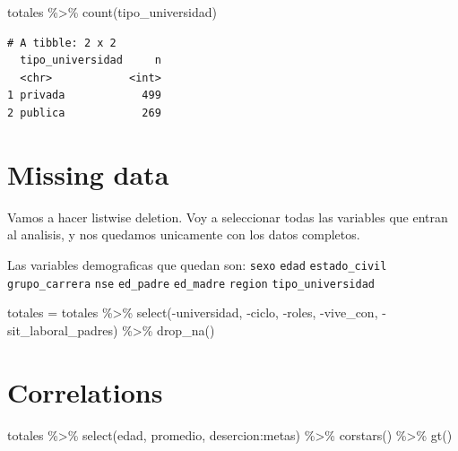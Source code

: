 \documentclass[
  letterpaper,
  DIV=11,
  numbers=noendperiod]{scrartcl}
\newenvironment{Shaded}{\begin{snugshade}}{\end{snugshade}}
\newcommand{\FunctionTok}[1]{\textcolor[rgb]{0.28,0.35,0.67}{#1}}
\newcommand{\NormalTok}[1]{\textcolor[rgb]{0.00,0.23,0.31}{#1}}
\newcommand{\OtherTok}[1]{\textcolor[rgb]{0.00,0.23,0.31}{#1}}
\newcommand{\SpecialCharTok}[1]{\textcolor[rgb]{0.37,0.37,0.37}{#1}}
\begin{document}
\begin{Shaded}
\begin{Highlighting}[]
\NormalTok{totales }\SpecialCharTok{\%\textgreater{}\%} \FunctionTok{count}\NormalTok{(tipo\_universidad)}
\end{Highlighting}
\end{Shaded}

\begin{verbatim}
# A tibble: 2 x 2
  tipo_universidad     n
  <chr>            <int>
1 privada            499
2 publica            269
\end{verbatim}

\section{Missing data}\label{missing-data}

Vamos a hacer listwise deletion. Voy a seleccionar todas las variables
que entran al analisis, y nos quedamos unicamente con los datos
completos.

Las variables demograficas que quedan son: \texttt{sexo} \texttt{edad}
\texttt{estado\_civil} \texttt{grupo\_carrera} \texttt{nse}
\texttt{ed\_padre} \texttt{ed\_madre} \texttt{region}
\texttt{tipo\_universidad}

\begin{Shaded}
\begin{Highlighting}[]
\NormalTok{totales }\OtherTok{=}\NormalTok{ totales }\SpecialCharTok{\%\textgreater{}\%} \FunctionTok{select}\NormalTok{(}\SpecialCharTok{{-}}\NormalTok{universidad, }\SpecialCharTok{{-}}\NormalTok{ciclo, }\SpecialCharTok{{-}}\NormalTok{roles, }\SpecialCharTok{{-}}\NormalTok{vive\_con, }\SpecialCharTok{{-}}\NormalTok{sit\_laboral\_padres) }\SpecialCharTok{\%\textgreater{}\%} \FunctionTok{drop\_na}\NormalTok{()}
\end{Highlighting}
\end{Shaded}

\section{Correlations}\label{correlations}

\begin{Shaded}
\begin{Highlighting}[]
\NormalTok{totales }\SpecialCharTok{\%\textgreater{}\%} \FunctionTok{select}\NormalTok{(edad, promedio, desercion}\SpecialCharTok{:}\NormalTok{metas) }\SpecialCharTok{\%\textgreater{}\%} \FunctionTok{corstars}\NormalTok{() }\SpecialCharTok{\%\textgreater{}\%} \FunctionTok{gt}\NormalTok{()}
\end{Highlighting}
\end{Shaded}
\end{document}

